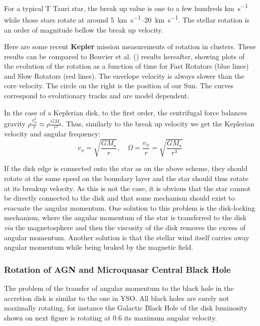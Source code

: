 \documentclass[10pt,a4paper,english]{article}
\begin{document}
For a typical T Tauri star, the break up value is one to a few hundreds
\si{\km\per\s} while those stars rotate at around \SIrange{5}{20}{\km\per\s}.
The stellar rotation is an order of magnitude bellow the break up velocity.

Here are some recent \textbf{Kepler} mission measurements of rotation in
clusters.   These results can be compared to Bouvier et
al. () results hereafter, showing plots of the
evolution of the rotation as a function of time for Fast Rotators (blue lines)
and Slow Rotators (red lines). The envelope velocity is always slower than the
core velocity. The circle on the right is the position of our Sun. The curves
correspond to evolutionary tracks and are model dependent.


In the case of a Keplerian disk, to the first order, the centrifugal force
balances gravity $\rho \frac{v_\phi^2}{r} \approx \rho \frac{GM_\star}{r^2}$.
Thus, similarly to the break up velocity we get the Keplerian velocity and
angular frequency:
\begin{equation}
    v_\phi = \sqrt{\frac{GM_\star}{r}}, \quad \Omega = \frac{v_\phi}{r} = \sqrt{\frac{GM_\star}{r^3}}
\end{equation}

If the disk edge is connected onto the star as on the above scheme, they should
rotate at the same speed on the boundary layer and the star should thus rotate
at its breakup velocity. As this is not the case, it is obvious that the star
cannot be directly connected to the disk and that some mechanism should exist
to evacuate the angular momentum. One solution to this problem is the
disk-locking mechanism, where the angular momentum of the star is transferred
to the disk \emph{via} the magnetosphere and then the viscosity of the disk
removes the excess of angular momentum. Another solution is that the stellar
wind itself carries away angular momentum while being braked by the magnetic
field.

\subsubsection{Rotation of AGN and Microquasar Central Black Hole}

The problem of the transfer of angular momentum to the black hole in the
accretion disk is similar to the one in YSO. All black holes are surely not
maximally rotating, for instance the Galactic Black Hole of the disk luminosity
shown on next figure is rotating at 0.6 its maximum angular velocity.
\end{document}
